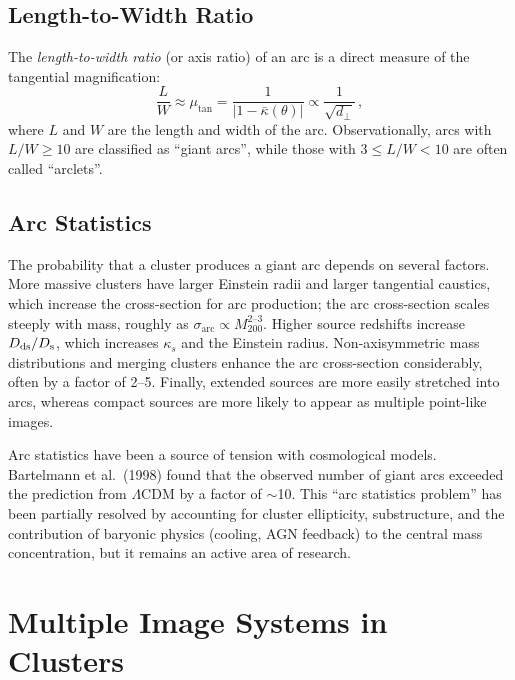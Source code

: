 \subsection{Length-to-Width Ratio}

The \emph{length-to-width ratio} (or axis ratio) of an arc is a
direct measure of the tangential magnification:
\begin{equation}
    \frac{L}{W} \approx \mu_{\mathrm{tan}}
    = \frac{1}{|1 - \bar{\kappa}(\theta)|}
    \propto \frac{1}{\sqrt{d_\perp}} \,,
    \label{eq:arc_lw_ratio}
\end{equation}
where $L$ and $W$ are the length and width of the arc.  Observationally,
arcs with $L/W \geq 10$ are classified as ``giant arcs'', while those
with $3 \leq L/W < 10$ are often called ``arclets''.

\subsection{Arc Statistics}
\label{sec:arc_statistics}

The probability that a cluster produces a giant arc depends on
several factors.  More massive clusters have larger Einstein radii
and larger tangential caustics, which increase the cross-section for
arc production; the arc cross-section scales steeply with mass,
roughly as $\sigma_{\mathrm{arc}}
\propto M_{200}^{2\text{--}3}$.  Higher source redshifts increase
$D_{\mathrm{ds}}/D_{\mathrm{s}}$, which increases $\kappa_s$ and the Einstein radius.
Non-axisymmetric mass distributions and merging clusters enhance the
arc cross-section considerably, often by a factor of 2--5.  Finally,
extended sources are more easily stretched into arcs, whereas compact
sources are more likely to appear as multiple point-like images.

\begin{remark}
Arc statistics have been a source of tension with cosmological models.
Bartelmann et al.\ (1998) found that the observed number of giant arcs
exceeded the prediction from $\Lambda$CDM by a factor of $\sim$10.
This ``arc statistics problem'' has been partially resolved by
accounting for cluster ellipticity, substructure, and the contribution
of baryonic physics (cooling, AGN feedback) to the central mass
concentration, but it remains an active area of research.
\end{remark}


\section{Multiple Image Systems in Clusters}
\label{sec:multiple_images}

